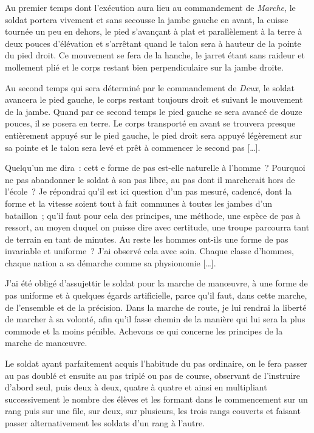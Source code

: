 \documentclass[french,twoside]{book} %
\begin{document}
Au premier temps dont l’exécution aura lieu au commandement de {\itshape Marche}, le soldat portera vivement et sans secousse la jambe gauche en avant, la cuisse tournée un peu en dehors, le pied s’avançant à plat et parallèlement à la terre à deux pouces d’élévation et s’arrêtant quand le talon sera à hauteur de la pointe du pied droit. Ce mouvement se fera de la hanche, le jarret étant sans raideur et mollement plié et le corps restant bien perpendiculaire sur la jambe droite.\par
Au second temps qui sera déterminé par le commandement de {\itshape Deux}, le soldat avancera le pied gauche, le corps restant toujours droit et suivant le mouvement de la jambe. Quand par ce second temps le pied gauche se sera avancé de douze pouces, il se posera en terre. Le corps transporté en avant se trouvera presque entièrement appuyé sur le pied gauche, le pied droit sera appuyé légèrement sur sa pointe et le talon sera levé et prêt à commencer le second pas […].\par
Quelqu’un me dira : cett
\label{\_GoBack}e forme de pas est-elle naturelle à l’homme ? Pourquoi ne pas abandonner le soldat à son pas libre, au pas dont il marcherait hors de l’école ? Je répondrai qu’il est ici question d’un pas mesuré, cadencé, dont la forme et la vitesse soient tout à fait communes à toutes les jambes d’un bataillon ; qu’il faut pour cela des principes, une méthode, une espèce de pas à ressort, au moyen duquel on puisse dire avec certitude, une troupe parcourra tant de terrain en tant de minutes. Au reste les hommes ont-ils une forme de pas invariable et uniforme ? J’ai observé cela avec soin. Chaque classe d’hommes, chaque nation a sa démarche comme sa physionomie […].\par
J’ai été obligé d’assujettir le soldat pour la marche de manœuvre, à une forme de pas uniforme et à quelques égards artificielle, parce qu’il faut, dans cette marche, de l’ensemble et de la précision. Dans la marche de route, je lui rendrai la liberté de marcher à sa volonté, afin qu’il fasse chemin de la manière qui lui sera la plus commode et la moins pénible. Achevons ce qui concerne les principes de la marche de manœuvre.\par
Le soldat ayant parfaitement acquis l’habitude du pas ordinaire, on le fera passer au pas doublé et ensuite au pas triplé ou pas de course, observant de l’instruire d’abord seul, puis deux à deux, quatre à quatre et ainsi en multipliant successivement le nombre des élèves et les formant dans le commencement sur un rang puis sur une file, sur deux, sur plusieurs, les trois rangs couverts et faisant passer alternativement les soldats d’un rang à l’autre.\par
\end{document}
